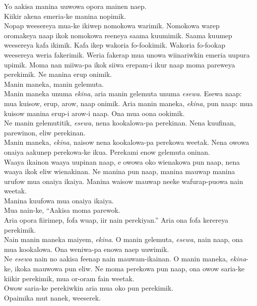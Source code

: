 Yo aakisa manina uuwowa opora mainen naep. \\
Kiikir akena emeria-ke manina nopimik. \\
\textrm{Nopap weesereya  mua-ke ikiwep nomokowa warimik. }
\textrm{Nomokowa warep oromakeya naap ikok nomokowa reeneya  saama kuumimik. }
\textrm{Saama kuumep weesereya kafa ikimik. }
\textrm{Kafa ikep wakoria fo-fookimik. }
\textrm{Wakoria fo-fookap weesereya weria fakerimik. }
\textrm{Weria fakerap mua unowa wiinariwkin emeria uupura upimik. }
\textrm{Moma nan miiwa-pa ikok siiwa erepam-i ikur naap moma pareweya perekimik. }
Ne manina erup onimik. \\
Manin maneka, manin gelemuta. \\
\textrm{Manin maneka unuma }\textrm{\textit{ekina}}\textrm{,  aria manin gelemuta unuma }\textrm{\textit{esewa}}\textrm{. }
\textrm{Esewa naap:  mua kuisow, erup, arow, naap onimik. }
\textrm{Aria manin maneka, }\textrm{\textit{ekina}}\textrm{, pun naap:  mua kuisow manina erup-i arow-i naap. }
Ona mua oona ookimik. \\
\textrm{Ne manin gelemutitik, }\textrm{\textit{esewa}}\textrm{, nena kookalowa-pa perekinan. }
Nena kuufinan,  parewinon,  eliw perekinan. \\
\textrm{Manin maneka, }\textrm{\textit{ekina}}\textrm{, naisow nena kookalowa-pa perekowa weetak. }
\textrm{Nena owowa onaiya aakunep perekowa-ke ikua. }
Perekami  enow gelemuta oninan. \\
\textrm{Waaya ikainon waaya uupinan naap,  e owowa oko wienakowa pun naap,  nena waaya ikok  eliw wienakinan. }
\textrm{Ne manina pun naap,  manina mauwap manina urufow mua onaiya ikaiya. }
Manina waisow mauwap neeke wafurap-puowa nain weetak. \\
Manina kuufowa mua onaiya ikaiya. \\
Mua nain-ke,  “Aakisa moma parewok. \\
\textrm{Aria opora fiirimep,  fofa wuap,  iir nain perekiyan.” }
Aria ona fofa kerereya  perekimik. \\
\textrm{Nain manin maneka maiyem, }\textrm{\textit{ekina}}\textrm{. }
\textrm{O manin gelemuta, }\textrm{\textit{esewa}}\textrm{, nain naap,  ona mua kookalowa. }
Ona weniwa-pa enowa naep uuwimik. \\
\textrm{Ne }\textrm{\textit{esewa}}\textrm{ nain no aakisa feenap nain mauwam-ikainan. }
\textrm{O manin maneka, }\textrm{\textit{ekina}}\textrm{{}-ke, ikoka mauwowa pun eliw. }
Ne moma perekowa pun naap,  ona owow saria-ke kiikir perekimik,  mua or-oram fain weetak. \\
Owow saria-ke perekiwkin  aria mua oko pun perekimik. \\
Opaimika mut nanek, weeserek. \\
\setcounter{equation}{0}
